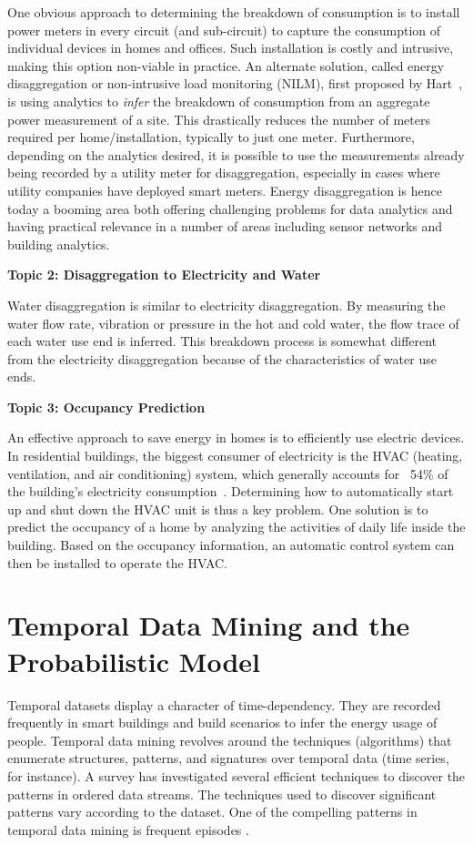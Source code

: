 One obvious approach to determining the breakdown of consumption is to install
power meters in every circuit (and sub-circuit)
to capture the consumption of individual devices in homes and
offices. Such installation is costly and intrusive, making 
this option non-viable in practice. 
An alternate
solution, called energy disaggregation or non-intrusive load monitoring
(NILM),
first proposed by Hart~\cite{hart1992}, is using analytics to 
{\em infer} the breakdown of consumption from an aggregate 
power measurement of a
site. This drastically reduces the number of meters required per 
home/installation, typically to just one meter. Furthermore, depending on the analytics desired, it is possible to
use the measurements already being recorded by a utility meter for
disaggregation, especially in cases where utility companies have deployed
smart meters.
Energy disaggregation is hence today a booming area both offering
challenging problems for data analytics and having practical relevance in a
number of areas including sensor networks and building analytics.

\textbf{Topic 2: Disaggregation to Electricity and Water}

Water disaggregation \cite{carboni2016contextualising} is similar to electricity disaggregation. 
By measuring the water flow rate, vibration or pressure in the hot and cold water, 
the flow trace of each water use end is inferred. 
This breakdown process is somewhat different from the electricity disaggregation 
because of the characteristics of water use ends. 

\textbf{Topic 3: Occupancy Prediction}

An effective approach to save energy in homes is to 
efficiently use electric devices.  
In residential buildings, 
the biggest consumer of electricity is the HVAC 
(heating, ventilation, and air conditioning) system, which generally accounts for ~54\% 
of the building's electricity consumption~\cite{book2014us}. 
Determining how to automatically start up and shut down the HVAC unit 
is thus a key problem. 
One solution is to predict the occupancy of a home by analyzing the activities of daily life 
inside the building. 
Based on the occupancy information, 
an automatic control system can then be installed
to operate the HVAC. 

\section{Temporal Data Mining and the Probabilistic Model}
Temporal datasets display a character of time-dependency. 
They are recorded frequently in smart buildings 
and build scenarios to infer the energy usage of people.
 Temporal data mining revolves around the techniques (algorithms) that enumerate structures, patterns, and signatures over temporal data (time series, for instance). 
 A survey \cite{laxman2006survey} has investigated several efficient 
 techniques to discover the patterns in ordered data streams.  
 The techniques used to discover significant patterns vary according to the dataset. 
 One of the compelling patterns in temporal data mining is frequent episodes \cite{mannila1997discovery}.

